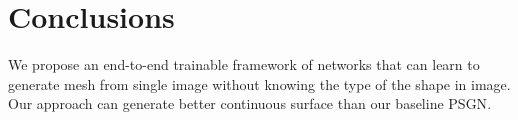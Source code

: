 \section{Conclusions}
We propose an end-to-end trainable framework of networks that can learn to generate mesh from single image without knowing the type of the shape in image. Our approach can generate better continuous surface than our baseline PSGN\cite{PSGN}.
